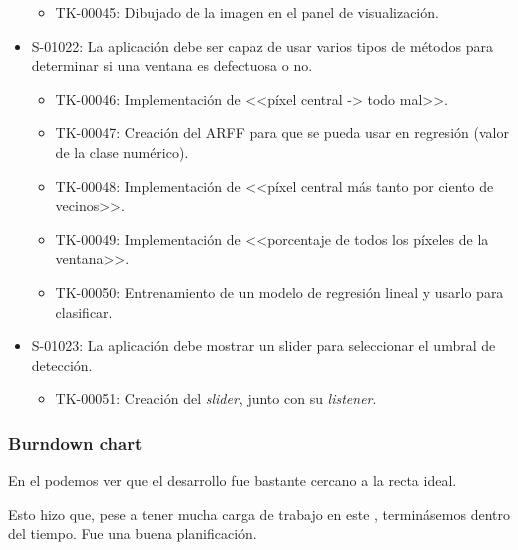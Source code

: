 \begin{itemize}
\begin{itemize}
   \item TK-00045: Dibujado de la imagen en el panel de visualización.
  \end{itemize}
 \item S-01022: La aplicación debe ser capaz de usar varios tipos de métodos para determinar si una ventana es defectuosa o no.
  \begin{itemize}
   \item TK-00046: Implementación de <<píxel central -> todo mal>>.
   \item TK-00047: Creación del ARFF para que se pueda usar en regresión (valor de la clase numérico).
   \item TK-00048: Implementación de <<píxel central más tanto por ciento de vecinos>>.
   \item TK-00049: Implementación de <<porcentaje de todos los píxeles de la ventana>>.
   \item TK-00050: Entrenamiento de un modelo de regresión lineal y usarlo para clasificar.
  \end{itemize}
 \item S-01023: La aplicación debe mostrar un slider para seleccionar el umbral de detección.
  \begin{itemize}
   \item TK-00051: Creación del \emph{slider}, junto con su \emph{listener}.
  \end{itemize}
\end{itemize}

\subsubsection*{Burndown chart}
En el \burndownchart{}  podemos ver que el desarrollo fue bastante cercano a la recta ideal.


Esto hizo que, pese a tener mucha carga de trabajo en este \sprint{}, terminásemos dentro del tiempo. Fue una buena planificación.

